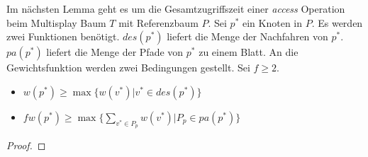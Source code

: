 \documentclass[a4paper,12pt]{article}
\begin{document}
\noindent Im nächsten Lemma geht es um die Gesamtzugriffszeit einer \textit{access} Operation beim Multisplay Baum $T$ mit Referenzbaum $P$. Sei $p^*$ ein Knoten in $P$. Es werden zwei Funktionen benötigt. $\mathit{des}\left(p^*\right)$ liefert die Menge der Nachfahren von $p^*$.  $\mathit{pa}\left(p^*\right)$ liefert die Menge der Pfade von $p^*$ zu einem Blatt. An die Gewichtsfunktion werden zwei Bedingungen gestellt. Sei $f \geq 2$.
\begin{itemize}
	\item $w\left(p^*\right) \geq \max \{  w\left(v^*\right)\vert  v^*
	\in\mathit{des}\left(p^*\right)  \}$
	\item $f  w\left(p^*\right) \geq    \max \{  \sum_{v^* \in P_p }  w\left(v^*\right)\vert    P_p \in \mathit{pa}\left(p^*\right) \}  $
\end{itemize}
\begin{Lemma2}
	
\end{Lemma2}
\begin{proof}
	
	
\end{proof}

\newpage


\end{document}
